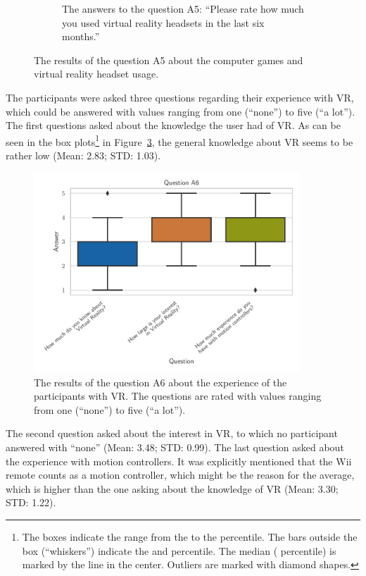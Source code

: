 \begin{figure}[H]
\begin{subfigure}{.48\linewidth}
		\caption{The answers to the question A5: \enquote{Please rate how much you used virtual reality headsets in the last six months.}}\label{fig:res-demo-q8-s4}
	\end{subfigure}%
	\caption[Computer games and VR usage]{The results of the question A5 about the computer games and virtual reality headset usage.}\label{fig:res-demo-q8}
\end{figure}

The participants were asked three questions regarding their experience with \ac{VR}, which could be answered with values ranging from one (\enquote{none}) to five (\enquote{a lot}). The first questions asked about the knowledge the user had of \ac{VR}. As can be seen in the box plots\footnote{The boxes indicate the range from the  to the  percentile. The bars outside the box (\enquote{whiskers}) indicate the  and  percentile. The median ( percentile) is marked by the line in the center. Outliers are marked with diamond shapes.} in Figure~\ref{fig:res-demo-q9}, the general knowledge about \ac{VR} seems to be rather low (Mean: 2.83; \ac{STD}: 1.03).

\begin{figure}[H]
	\centering
	\includegraphics[width=10cm]{figures/evaluation/res_demo_q9.pdf}
	\caption[VR experience of the participants]{The results of the question A6 about the experience of the participants with \ac{VR}. The questions are rated with values ranging from one (\enquote{none}) to five (\enquote{a lot}).}\label{fig:res-demo-q9}
\end{figure}

The second question asked about the interest in \ac{VR}, to which no participant answered with \enquote{none} (Mean: 3.48; \ac{STD}: 0.99). The last question asked about the experience with motion controllers. It was explicitly mentioned that the Wii remote counts as a motion controller, which might be the reason for the average, which is higher than the one asking about the knowledge of \ac{VR} (Mean: 3.30; \ac{STD}: 1.22).



